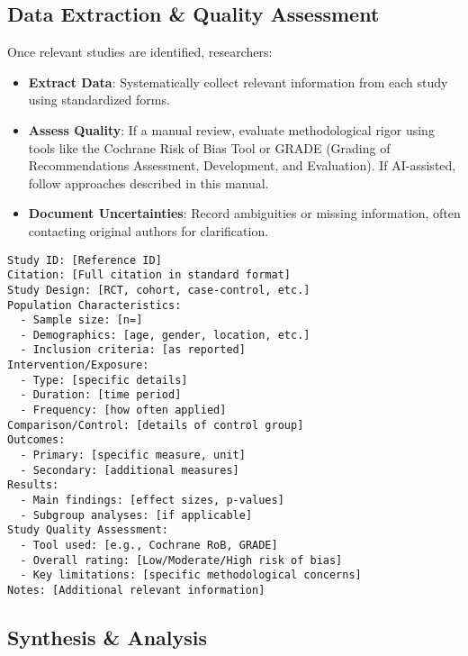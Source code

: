 \subsection{Data Extraction \& Quality Assessment}

Once relevant studies are identified, researchers:

\begin{itemize}
    \item \textbf{Extract Data}: Systematically collect relevant information from each study using standardized forms.
    \item \textbf{Assess Quality}: If a manual review, evaluate methodological rigor using tools like the Cochrane Risk of Bias Tool or GRADE (Grading of Recommendations Assessment, Development, and Evaluation). If AI-assisted, follow approaches described in this manual.
    \item \textbf{Document Uncertainties}: Record ambiguities or missing information, often contacting original authors for clarification.
\end{itemize}

\begin{infobox}
\begin{lstlisting}
Study ID: [Reference ID]
Citation: [Full citation in standard format]
Study Design: [RCT, cohort, case-control, etc.]
Population Characteristics:
  - Sample size: [n=]
  - Demographics: [age, gender, location, etc.]
  - Inclusion criteria: [as reported]
Intervention/Exposure:
  - Type: [specific details]
  - Duration: [time period]
  - Frequency: [how often applied]
Comparison/Control: [details of control group]
Outcomes:
  - Primary: [specific measure, unit]
  - Secondary: [additional measures]
Results:
  - Main findings: [effect sizes, p-values]
  - Subgroup analyses: [if applicable]
Study Quality Assessment:
  - Tool used: [e.g., Cochrane RoB, GRADE]
  - Overall rating: [Low/Moderate/High risk of bias]
  - Key limitations: [specific methodological concerns]
Notes: [Additional relevant information]
\end{lstlisting}
\end{infobox}

\subsection{Synthesis \& Analysis}

